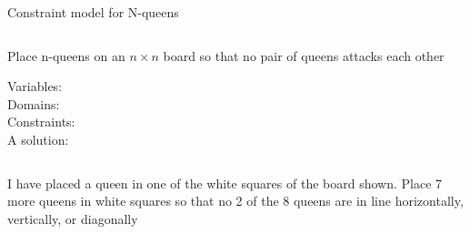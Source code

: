 \begin{frame}[plain]{Constraint model for N-queens}
\begin{columns}
\begin{column}{0.57\textwidth}
Place n-queens on an $n \times n$ board so that no pair of queens attacks each other

\begin{description}
\item[Variables:] 
\item[Domains:]  
\item[Constraints:] 

\item[A solution:]
\end{description}
\end{column}

\begin{column}{0.43\textwidth}
 \\
 
\end{column}
\end{columns}
\begin{example}
I have placed a queen in one of the white squares of the board shown. Place 7 more
queens in white squares so that no 2 of the 8 queens are in line horizontally, vertically,
or diagonally
\end{example}
\hfill
{} 
\end{frame}



